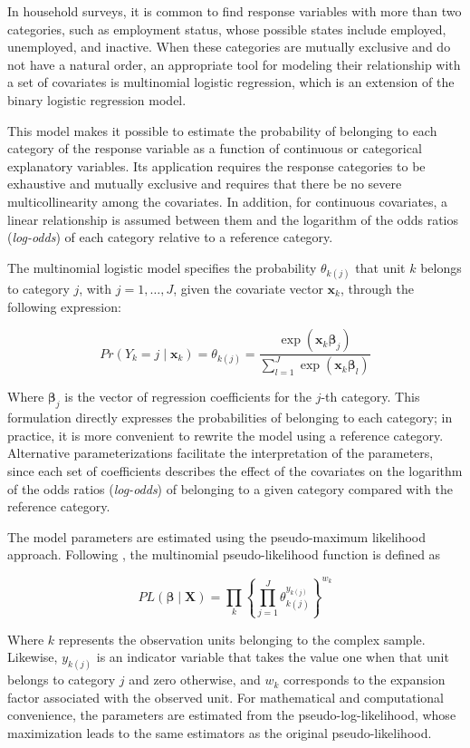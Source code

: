 \documentclass[
  english,
  12pt,
]{book}
\begin{document}
In household surveys, it is common to find response variables with more than two categories, such as employment status, whose possible states include employed, unemployed, and inactive. When these categories are mutually exclusive and do not have a natural order, an appropriate tool for modeling their relationship with a set of covariates is multinomial logistic regression, which is an extension of the binary logistic regression model.

This model makes it possible to estimate the probability of belonging to each category of the response variable as a function of continuous or categorical explanatory variables. Its application requires the response categories to be exhaustive and mutually exclusive and requires that there be no severe multicollinearity among the covariates. In addition, for continuous covariates, a linear relationship is assumed between them and the logarithm of the odds ratios (\emph{log-odds}) of each category relative to a reference category.

The multinomial logistic model specifies the probability \(\theta_{k(j)}\) that unit \(k\) belongs to category \(j\), with \(j=1,\ldots,J\), given the covariate vector \(\mathbf{x}_k\), through the following expression:

\[
Pr(Y_{k} = j \mid \mathbf{x}_{k})
=
\theta_{k(j)}
=
\frac{\exp(\mathbf{x}_{k}\boldsymbol{\beta}_j)}
     {\sum_{l=1}^{J} \exp(\mathbf{x}_{k}\boldsymbol{\beta}_l)}
\]

Where \(\boldsymbol{\beta}_j\) is the vector of regression coefficients for the \(j\)-th category. This formulation directly expresses the probabilities of belonging to each category; in practice, it is more convenient to rewrite the model using a reference category. Alternative parameterizations facilitate the interpretation of the parameters, since each set of coefficients describes the effect of the covariates on the logarithm of the odds ratios (\emph{log-odds}) of belonging to a given category compared with the reference category.

The model parameters are estimated using the pseudo-maximum likelihood approach. Following \citet{heeringa2017applied}, the multinomial pseudo-likelihood function is defined as

\[
PL(\boldsymbol{\beta} \mid \mathbf{X}) =
\prod_{k}
\left\{
\prod_{j=1}^{J}
\theta_{k(j)}^{y_{k(j)}}
\right\}^{w_{k}}
\]

Where \(k\) represents the observation units belonging to the complex sample. Likewise, \(y_{k(j)}\) is an indicator variable that takes the value one when that unit belongs to category \(j\) and zero otherwise, and \(w_{k}\) corresponds to the expansion factor associated with the observed unit. For mathematical and computational convenience, the parameters are estimated from the pseudo-log-likelihood, whose maximization leads to the same estimators as the original pseudo-likelihood.
\end{document}
